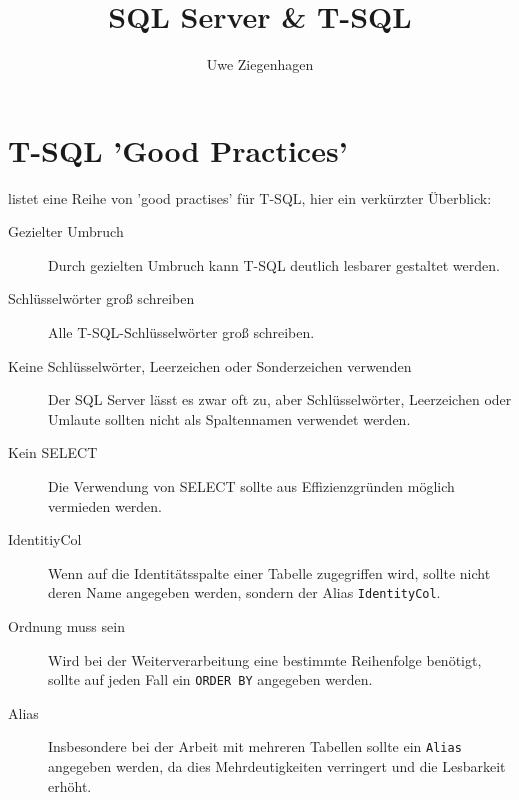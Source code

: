 \documentclass[12pt,ngerman,a4paper,index=totoc,twoside]{scrartcl}
\author{Uwe Ziegenhagen}
\title{SQL Server \& T-SQL}
\newcommand{\sql}[1]{\texttt{#1}}
\begin{document}
\maketitle

\tableofcontents

\listoftables

\clearpage

\section{T-SQL 'Good Practices'}

\cite{knigge} listet eine Reihe von 'good practises' für T-SQL, hier ein verkürzter Überblick:

\begin{description}
	\item[Gezielter Umbruch] 

Durch gezielten Umbruch kann T-SQL deutlich lesbarer gestaltet werden.
	
	\item[Schlüsselwörter groß schreiben] 
	
Alle T-SQL-Schlüsselwörter groß schreiben.	
	
	\item[Keine Schlüsselwörter, Leerzeichen oder Sonderzeichen verwenden] 
	
Der SQL Server lässt es zwar oft zu, aber Schlüsselwörter, Leerzeichen oder Umlaute sollten nicht als Spaltennamen verwendet werden.
	
	\item[Kein SELECT \textasteriskcentered] 
	
Die Verwendung von SELECT \textasteriskcentered  sollte aus Effizienzgründen möglich vermieden werden.
	
	\item[IdentitiyCol] 
	
Wenn auf die Identitätsspalte einer Tabelle zugegriffen wird, sollte nicht deren Name angegeben werden, sondern der Alias \sql{IdentityCol}. 	
	
	\item[Ordnung muss sein] 
	
Wird bei der Weiterverarbeitung eine bestimmte Reihenfolge benötigt, sollte auf jeden Fall ein \sql{ORDER BY} angegeben werden. 
	
	\item[Alias] 
	
Insbesondere bei der Arbeit mit mehreren Tabellen sollte ein \sql{Alias} angegeben werden, da dies Mehrdeutigkeiten verringert und die Lesbarkeit erhöht.
	

\end{description}
\end{document}

